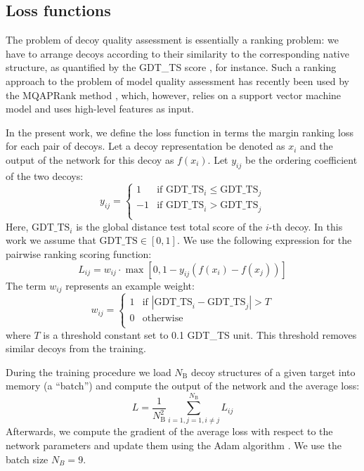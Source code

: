 \subsection{Loss functions}
The problem of decoy quality assessment is essentially a ranking
problem: we have to arrange decoys according to their similarity to
the corresponding native structure, as quantified by the GDT\_TS score
\cite{zemla2001casp4}, for instance. Such a ranking approach to the
problem of model quality assessment has recently been used by the
MQAPRank method \cite{jing2016sorting}, which, however, relies on a
support vector machine model and uses high-level features as
input.

In the present work, we define the loss function in terms the margin
ranking loss for each pair of decoys. Let a decoy representation be
denoted as $x_i$ and the output of the network for this decoy as
$f(x_i)$. Let $y_{ij}$ be the ordering coefficient of the two decoys:
$$
y_{ij} = \begin{cases}
               1& \text{if }\text{GDT\_TS}_i \leq \text{GDT\_TS}_j \\
               -1& \text{if }\text{GDT\_TS}_i > \text{GDT\_TS}_j \\
            \end{cases}
$$
%
Here, $\text{GDT\_TS}_i$ is the global distance test total score of
the $i$-th decoy. In this work we assume that $\text{GDT\_TS}\in [0,1]$. We use the following expression for the pairwise
ranking scoring function:
$$
L_{ij} = w_{ij} \cdot \max \left[ 0, 1 - y_{ij} \left( f \left( x_i \right) - f \left( x_j \right) \right) \right]
$$
%
The term $w_{ij}$ represents an example weight:
%
$$
w_{ij} = \begin{cases}
               1& \text{if } \left| \text{GDT\_TS}_i - \text{GDT\_TS}_j \right| > T \\
               0& \text{otherwise} \\ 
            \end{cases}
$$
%
where $T$ is a threshold constant set to 0.1 GDT\_TS unit. This threshold removes similar decoys from 
the training.

During the training procedure we load $N_\text{B}$ decoy structures of
a given target into memory (a ``batch'') and compute the output of the
network and the average loss:
$$ L = \frac{1}{N^{2}_\text{B}} \sum_{i=1,j=1, i \neq j}^{N_\text{B}} L_{ij} $$
Afterwards, we compute the gradient of the average loss with respect
to the network parameters and update them using the Adam algorithm
\cite{kingma2014adam}. We use the batch size $N_B = 9$.


